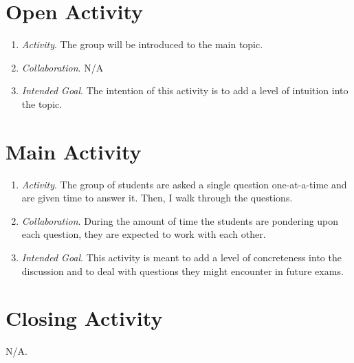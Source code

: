 \documentclass[11pt]{article}
\begin{document}
\newpage
{}
\section{\centering Open Activity}
	\begin{enumerate}
		\item \textit{Activity}. The group will be introduced to the main topic.
		\item \textit{Collaboration}. N/A
		\item \textit{Intended Goal}. The intention of this activity is to add a level of intuition into the topic.
	\end{enumerate}

\section{\centering Main Activity}
	\begin{enumerate}
		\item \textit{Activity}. The group of students are asked a single question one-at-a-time and are given time to answer it. Then, I walk through the 
			questions.
		\item \textit{Collaboration}. During the amount of time the students are pondering upon each question, they are expected to work with each other.
		\item \textit{Intended Goal}. This activity is meant to add a level of concreteness into the discussion and to deal with questions they might encounter
			in future exams.
	\end{enumerate}

\section{\centering Closing Activity}
	N/A.
\end{document}
